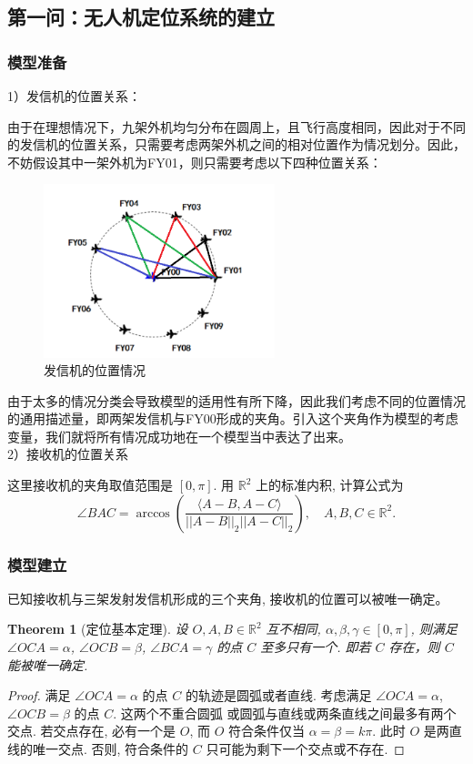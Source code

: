 \documentclass{my_paper}
\newcommand{\R}{\mathbb{R}}
\newtheorem{theorem}{Theorem}
\begin{document}
\subsection{第一问：无人机定位系统的建立}
\subsubsection{模型准备}
1）发信机的位置关系：

由于在理想情况下，九架外机均匀分布在圆周上，且飞行高度相同，因此对于不同的发信机的位置关系，只需要考虑两架外机之间的相对位置作为情况划分。因此，不妨假设其中一架外机为FY01，则只需要考虑以下四种位置关系：

\begin{figure}[H]
    \centering
    \includegraphics[width=0.6\textwidth]{pic1.png}
    \caption{发信机的位置情况} 
\end{figure}

由于太多的情况分类会导致模型的适用性有所下降，因此我们考虑不同的位置情况的通用描述量，即两架发信机与FY00形成的夹角。引入这个夹角作为模型的考虑变量，我们就将所有情况成功地在一个模型当中表达了出来。\\

2）接收机的位置关系

这里接收机的夹角取值范围是 $[0,\pi]$. 用 $\R^2$ 上的标准内积, 计算公式为
$$
    \angle BAC = \arccos (\frac{\langle A-B,A-C\rangle}{||A-B||_2||A-C||_2}),\quad A,B,C\in \R^2.
$$


\subsubsection{模型建立}

已知接收机与三架发射发信机形成的三个夹角, 接收机的位置可以被唯一确定。
\begin{theorem}[定位基本定理]
    设 $O,A,B\in\R^2$ 互不相同, $\alpha,\beta,\gamma\in[0,\pi]$, 则满足 $\angle OCA = \alpha$, $\angle OCB = \beta$, $\angle BCA = \gamma$ 的点 $C$ 
    至多只有一个. 即若 $C$ 存在，则 $C$ 能被唯一确定. 
\end{theorem}
\begin{proof}
    满足 $\angle OCA = \alpha$ 的点 $C$ 的轨迹是圆弧或者直线. 考虑满足 $\angle OCA = \alpha$, $\angle OCB = \beta$ 的点 $C$. 这两个不重合圆弧
    或圆弧与直线或两条直线之间最多有两个交点. 若交点存在, 必有一个是 $O$, 而 $O$ 符合条件仅当 $\alpha=\beta=k\pi$. 
    此时 $O$ 是两直线的唯一交点. 否则, 符合条件的 $C$ 只可能为剩下一个交点或不存在. 
\end{proof}
\end{document}
